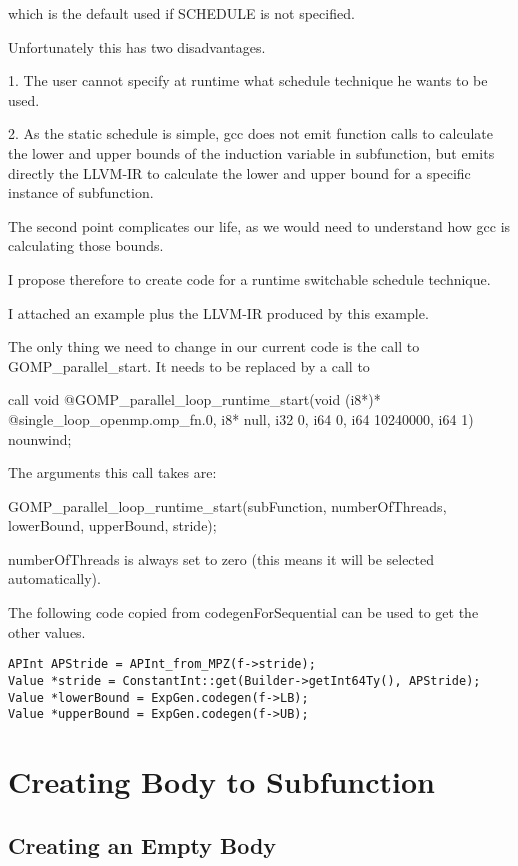 \documentclass[a4paper,10pt]{article}
\begin{document}
                which is the default used if SCHEDULE is not specified.

                Unfortunately this has two disadvantages.

                1. The user cannot specify at runtime what schedule technique he wants to be used.

                2. As the static schedule is simple, gcc does not emit function calls to calculate the lower and upper bounds of the induction variable in subfunction, but emits directly the LLVM-IR to calculate the lower and upper bound for a specific instance of subfunction.

                The second point complicates our life, as we would need to understand how gcc is calculating those bounds.

                I propose therefore to create code for a runtime switchable schedule technique.

                I attached an example plus the LLVM-IR produced by this example.

                The only thing we need to change in our current code is the call to
                GOMP\_parallel\_start. It needs to be replaced by a call to

                call void @GOMP\_parallel\_loop\_runtime\_start(void (i8*)* @single\_loop\_openmp.omp\_fn.0, i8* null, i32 0, i64 0, i64 10240000, i64 1) nounwind;

The arguments this call takes are:

GOMP\_parallel\_loop\_runtime\_start(subFunction, numberOfThreads, lowerBound, upperBound, stride);

numberOfThreads is always set to zero (this means it will be selected automatically).

The following code copied from codegenForSequential can be used to get
the other values.

\begin{verbatim}
APInt APStride = APInt_from_MPZ(f->stride);
Value *stride = ConstantInt::get(Builder->getInt64Ty(), APStride);
Value *lowerBound = ExpGen.codegen(f->LB);
Value *upperBound = ExpGen.codegen(f->UB);
\end{verbatim}

\section{Creating Body to Subfunction}

\subsection{Creating an Empty Body}
\end{document}
